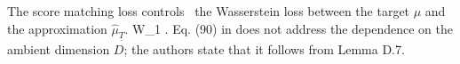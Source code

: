 The score matching loss controls~\cite[Eq. (90)]{oko2023} the Wasserstein loss between the target $\mu$ and the approximation $\hat{\mu}_{\underline{T}}$.
\label{thm:from_score_matching_to_wasserstein}
W_1\del{\hat{\mu}, \mu} \lesssim {}.
Eq. (90) in \cite{oko2023} does not address the dependence on the ambient dimension $D$; the authors state that it follows from Lemma D.7.
